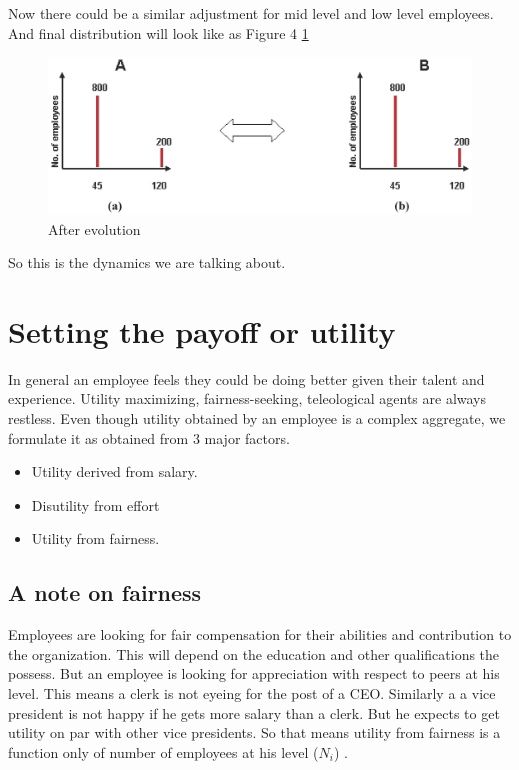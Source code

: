 \documentclass[letterpaper,english,10pt]{article}
\begin{document}
\begin{exmp}
 Now there could be a similar adjustment for mid level and low level employees. And final distribution will look like as Figure 4 \ref{fig:4}





\begin{figure}[h!] 
	\includegraphics[width=\linewidth]{dynamics3.png}
	\caption{After evolution}
	\label{fig:4}
\end{figure}

So this is the dynamics we are talking about.
\end{exmp}

\section{Setting the payoff or utility}
In general an employee feels they could be doing better given their talent and experience. Utility maximizing, fairness-seeking, teleological agents are always restless. Even though utility obtained by an employee is a complex aggregate, we formulate it as obtained from 3 major factors. 
\begin{itemize}
    \item Utility derived from salary.
    \item Disutility from effort
    \item Utility from fairness.
    
\end{itemize}
\subsection{A note on fairness}
Employees are looking for fair compensation for their abilities and contribution to the organization. This will depend on the education and other qualifications the possess. But an employee is looking for appreciation with respect to peers at his level. This means a clerk is not eyeing for the post of a CEO. Similarly a a vice president is not happy if he gets more salary than a clerk. But he expects to get utility on par with other vice presidents. So that means utility from fairness is a function only of number of employees at his level ($N_i$) . 
\end{document}
